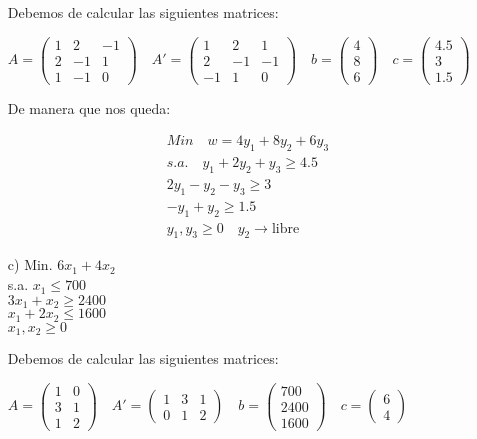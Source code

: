 \begin{itemize}
    Debemos de calcular las siguientes matrices:

    $ A =
    \begin{pmatrix}
        1 & 2 & -1 \\
        2 & -1 & 1 \\
        1 & -1 & 0
    \end{pmatrix} \quad
    A' = \begin{pmatrix}
        1 & 2 & 1 \\
        2 & -1 & -1 \\
        -1 & 1 & 0
    \end{pmatrix}
    \quad b = \begin{pmatrix}
        4 \\
        8 \\
        6
    \end{pmatrix} \quad c = \begin{pmatrix}
        4.5 \\
        3 \\
        1.5
    \end{pmatrix}
    $

    De manera que nos queda:

    \begin{align*}
        Min \quad w = 4y_1 + 8y_2 + 6y_3 \\
        s.a. \quad y_1 + 2y_2 + y_3 \geq 4.5 \\
        2y_1 - y_2 - y_3 \geq 3 \\
        - y_1 + y_2 \geq 1.5 \\
        y_1, y_3 \geq 0 \quad y_2 \rightarrow \text{libre}
    \end{align*}
    
    \item[c)] Min. \quad $6x_1 + 4x_2$ \\
    s.a. \quad $x_1 \leq 700$ \\
    \quad \quad $3x_1 + x_2 \geq 2400$ \\
    \quad \quad $x_1 + 2x_2 \leq 1600$ \\
    \quad \quad $x_1, x_2 \geq 0$

    Debemos de calcular las siguientes matrices:

    $ A =
    \begin{pmatrix}
        1 & 0 \\
        3 & 1 \\
        1 & 2
    \end{pmatrix} \quad
    A' = \begin{pmatrix}
        1 & 3 & 1 \\
        0 & 1 & 2
    \end{pmatrix}
    \quad b = \begin{pmatrix}
        700 \\
        2400 \\
        1600
    \end{pmatrix} \quad c = \begin{pmatrix}
        6 \\
        4
    \end{pmatrix}
    $


\end{itemize}
